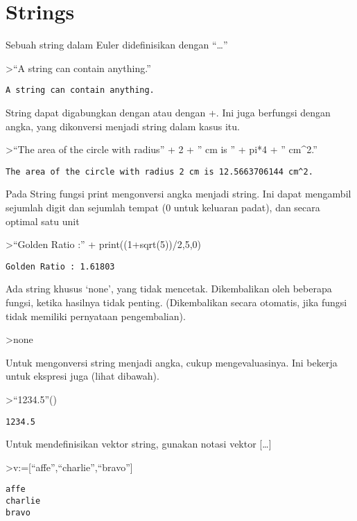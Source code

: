 \documentclass[
]{book}
\begin{document}
\chapter{Strings}\label{strings}

Sebuah string dalam Euler didefinisikan dengan ``\ldots{}''

\textgreater{}``A string can contain anything.''

\begin{verbatim}
A string can contain anything.
\end{verbatim}

String dapat digabungkan dengan \textbar{} atau dengan +. Ini juga berfungsi dengan angka, yang dikonversi menjadi string dalam kasus itu.

\textgreater{}``The area of the circle with radius'' + 2 + '' cm is '' + pi*4 + '' cm\^{}2.''

\begin{verbatim}
The area of the circle with radius 2 cm is 12.5663706144 cm^2.
\end{verbatim}

Pada String fungsi print mengonversi angka menjadi string. Ini dapat mengambil sejumlah digit dan sejumlah tempat (0 untuk keluaran padat), dan secara optimal satu unit

\textgreater{}``Golden Ratio :'' + print((1+sqrt(5))/2,5,0)

\begin{verbatim}
Golden Ratio : 1.61803
\end{verbatim}

Ada string khusus `none', yang tidak mencetak. Dikembalikan oleh beberapa fungsi, ketika hasilnya tidak penting. (Dikembalikan secara otomatis, jika fungsi tidak memiliki pernyataan pengembalian).

\textgreater none

Untuk mengonversi string menjadi angka, cukup mengevaluasinya. Ini bekerja untuk ekspresi juga (lihat dibawah).

\textgreater{}``1234.5''()

\begin{verbatim}
1234.5
\end{verbatim}

Untuk mendefinisikan vektor string, gunakan notasi vektor {[}\ldots{]}

\textgreater v:={[}``affe'',``charlie'',``bravo''{]}

\begin{verbatim}
affe
charlie
bravo
\end{verbatim}
\end{document}
